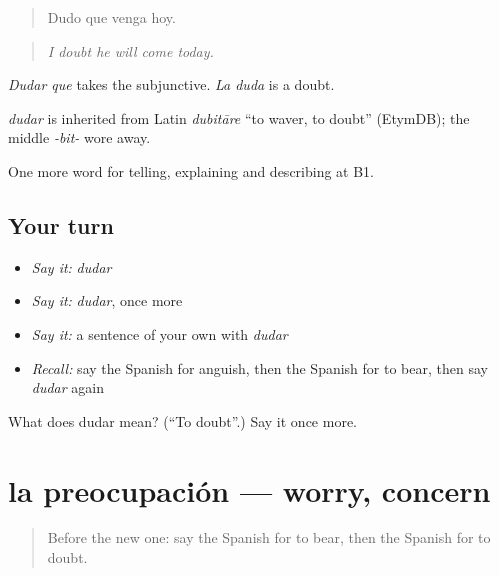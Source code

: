 \begin{quote}
Dudo que venga hoy.
\end{quote}

\begin{quote}
\emph{I doubt he will come today.}
\end{quote}

\emph{Dudar que} takes the subjunctive. \emph{La duda} is a doubt.

\begin{cousinweb}
\emph{dudar} is inherited from Latin \emph{dubitāre} \textquotedblleft{}to waver, to doubt\textquotedblright{} (EtymDB); the middle \emph{-bit-} wore away.
\end{cousinweb}

\begin{grammarlens}[title={What you've built}]
One more word for telling, explaining and describing at B1.
\end{grammarlens}

\subsection*{Your turn}
\begin{itemize}
\raggedright
  \item \emph{Say it:} \emph{dudar}
  \item \emph{Say it:} \emph{dudar}, once more
  \item \emph{Say it:} a sentence of your own with \emph{dudar}
  \item \emph{Recall:} say the Spanish for anguish, then the Spanish for to bear, then say \emph{dudar} again
\end{itemize}

\begin{tcolorbox}[breakable,colback=teal!4,colframe=teal!35!black,title={Before you move on}]
What does dudar mean? (\textquotedblleft{}To doubt\textquotedblright{}.) Say it once more.
\end{tcolorbox}
\section[la preocupación]{la preocupación — worry, concern}

\label{lesson:ES-C719-preocupacion}



\begin{quote}
Before the new one: say the Spanish for to bear, then the Spanish for to doubt.
\end{quote}

